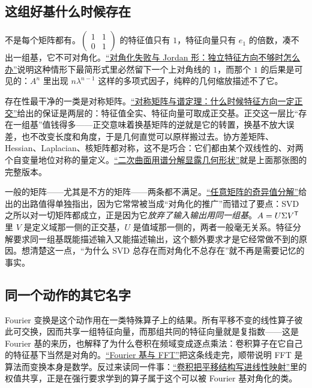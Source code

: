 \subsection{这组好基什么时候存在}

不是每个矩阵都有。\(\begin{pmatrix}1&1\\0&1\end{pmatrix}\) 的特征值只有 \(1\)，特征向量只有 \(e_1\) 的倍数，凑不出一组基，它不可对角化。\hyperref[sec:03-Linear-Algebra/05-Eigenvalues-and-Eigenvectors/03]{``对角化失败与 Jordan 形：独立特征方向不够时怎么办''}说明这种情形下最简形式里必然留下一个上对角线的 \(1\)，而那个 \(1\) 的后果是可见的：\(A^{n}\) 里出现 \(n\lambda^{n-1}\) 这样的多项式因子，纯粹的几何缩放描述不了它。

存在性最干净的一类是对称矩阵。\hyperref[sec:03-Linear-Algebra/06-Symmetric-and-Positive-Definite-Matrices/01]{``对称矩阵与谱定理：什么时候特征方向一定正交''}给出的保证是两层的：特征值全实、特征向量可取成正交基。正交这一层比``存在一组基''值钱得多——正交意味着换基矩阵的逆就是它的转置，换基不放大误差，也不改变长度和角度，于是几何直觉可以原样搬过去。协方差矩阵、Hessian、Laplacian、核矩阵都对称，这不是巧合：它们都由某个双线性的、对两个自变量地位对称的量定义。\hyperref[sec:03-Linear-Algebra/06-Symmetric-and-Positive-Definite-Matrices/04]{``二次曲面用谱分解显露几何形状''}就是上面那张图的完整版本。

一般的矩阵——尤其是不方的矩阵——两条都不满足。\hyperref[sec:03-Linear-Algebra/07-SVD-and-Data-Applications/01]{``任意矩阵的奇异值分解''}给出的出路值得单独指出，因为它常常被当成``对角化的推广''而错过了要点：SVD 之所以对一切矩阵都成立，正是因为它\emph{放弃了输入输出用同一组基}。\(A = U\Sigma V^{\mathsf{T}}\) 里 \(V\) 是定义域那一侧的正交基，\(U\) 是值域那一侧的，两者一般毫无关系。特征分解要求同一组基既能描述输入又能描述输出，这个额外要求才是它经常做不到的原因。想清楚这一点，``为什么 SVD 总存在而对角化不总存在''就不再是需要记忆的事实。

\subsection{同一个动作的其它名字}

Fourier 变换是这个动作用在一类特殊算子上的结果。所有平移不变的线性算子彼此可交换，因而共享一组特征向量，而那组共同的特征向量就是复指数——这是 Fourier 基的来历，也解释了为什么卷积在频域变成逐点乘法：卷积算子在它自己的特征基下当然是对角的。\hyperref[sec:03-Linear-Algebra/08-Complex-Matrices-and-Fourier-Structure/03]{``Fourier 基与 FFT''}把这条线走完，顺带说明 FFT 是算法而变换本身是数学。反过来读同一件事：\hyperref[sec:14-Deep-Learning/04-Convolutional-Networks/01]{``卷积把平移结构写进线性映射''}里的权值共享，正是在强行要求学到的算子属于这个可以被 Fourier 基对角化的类。

